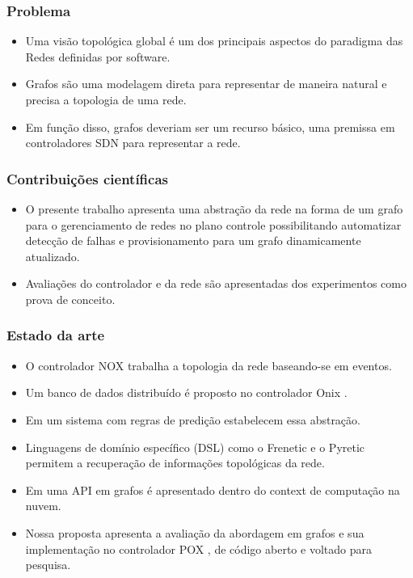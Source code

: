 %
%
\begin{frame}\frametitle{Problema}
    \begin{itemize}
        \setlength{\itemsep}{1cm}
        \item Uma visão topológica global é um dos principais aspectos do 
              paradigma das Redes definidas por software.
        \item Grafos são uma modelagem direta para representar de maneira 
              natural e precisa a topologia de uma rede.
        \item Em função disso, grafos deveriam ser um recurso básico, 
              uma premissa em controladores SDN para representar a rede.
    \end{itemize} 
\end{frame}


%
%
\begin{frame}\frametitle{Contribuições científicas}
    \begin{itemize}
        \setlength{\itemsep}{1cm}
        \item O presente trabalho apresenta uma abstração da rede na forma 
              de um grafo para o gerenciamento de redes no plano controle 
              possibilitando automatizar detecção de falhas e 
              provisionamento para um grafo dinamicamente atualizado.
        \item Avaliações do controlador e da rede são apresentadas dos
              experimentos como prova de conceito.

    \end{itemize}
\end{frame}


%
%
\begin{frame}\frametitle{Estado da arte}
    \begin{itemize}
        \item O controlador NOX \citep{gude2008nox} 
            trabalha a topologia da rede baseando-se em eventos.
            \item Um banco de dados distribuído é proposto no controlador Onix 
            \citep{teemu2010onix}.
        \item Em \citep{hinrichs2009pratical} um sistema com regras de predição 
            estabelecem essa abstração.
        \item Linguagens de domínio específico (DSL) como o Frenetic 
            \citep{foster2011frenetic} e o Pyretic 
            \citep{monsanto2013composing} permitem a recuperação de 
            informações topológicas da rede.
        \item Em \citep{ramya2012dynamic} uma API em grafos é apresentado 
            dentro do context de computação na nuvem.
        \item Nossa proposta apresenta a avaliação da abordagem em grafos e 
            sua implementação no controlador POX \citep{pox2015}, de código 
            aberto e voltado para pesquisa.
    \end{itemize} 
 
\end{frame}
